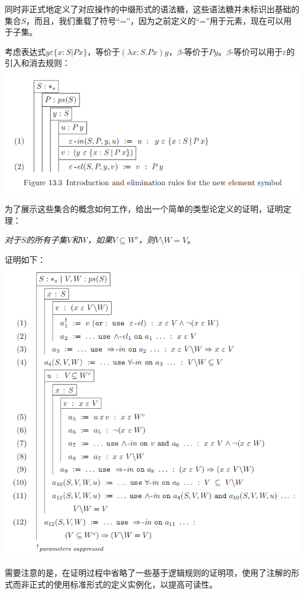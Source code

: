 \documentclass[UTF8]{article}
\begin{document}
		同时非正式地定义了对应操作的中缀形式的语法糖，这些语法糖并未标识出基础的集合$S$，而且，我们重载了符号“=”，因为之前定义的“=”用于元素，现在可以用于子集。
		
		考虑表达式$y\varepsilon\{x:S|Px\}$，等价于$(\lambda x:S.Px)y$，$\beta$-等价于$Py$。$\beta$-等价可以用于$\varepsilon$的引入和消去规则：\\
		\includegraphics[width=0.93\linewidth]{"../imgs/13-3.png"}
		
		为了展示这些集合的概念如何工作，给出一个简单的类型论定义的证明，证明定理：
		
		\textit{对于$S$的所有子集$V$和$W$，如果$V\subseteq W^c$，则$V\setminus W=V$}。
		
		证明如下：\\
		\includegraphics[width=0.93\linewidth]{"../imgs/13-4.png"}
		
		需要注意的是，在证明过程中省略了一些基于逻辑规则的证明项，使用了注解的形式而非正式的使用标准形式的定义实例化，以提高可读性。
		
\end{document}
